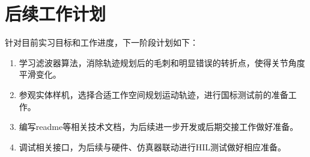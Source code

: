 \documentclass{ctexart}
\begin{document}
\section{后续工作计划}

针对目前实习目标和工作进度，下一阶段计划如下：

\begin{enumerate}
    \item 学习滤波器算法，消除轨迹规划后的毛刺和明显错误的转折点，使得关节角度平滑变化。
    \item 参观实体样机，选择合适工作空间规划运动轨迹，进行国标测试前的准备工作。
    \item 编写readme等相关技术文档，为后续进一步开发或后期交接工作做好准备。
    \item 调试相关接口，为后续与硬件、仿真器联动进行HIL测试做好相应准备。
\end{enumerate}
\end{document}
